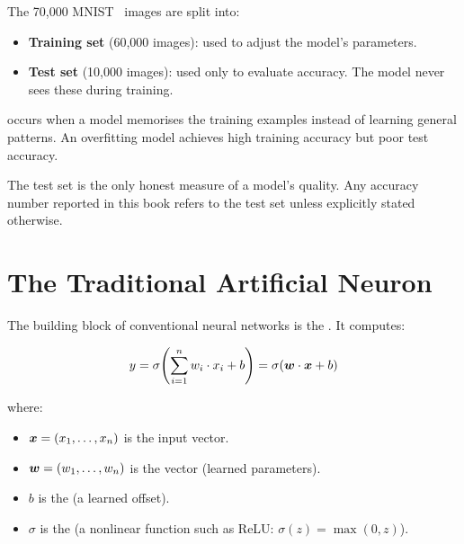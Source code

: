 The 70,000 MNIST~\cite{lecun1998mnist} images are split into:
\begin{itemize}
  \item \textbf{Training set} (60,000 images): used to adjust the
    model's parameters.
  \item \textbf{Test set} (10,000 images): used only to evaluate
    accuracy. The model never sees these during training.
\end{itemize}

 occurs when a model memorises the training
examples instead of learning general patterns. An overfitting model
achieves high training accuracy but poor test accuracy.

\begin{keyinsight}
The test set is the only honest measure of a model's quality. Any
accuracy number reported in this book refers to the test set unless
explicitly stated otherwise.
\end{keyinsight}


\section{The Traditional Artificial Neuron}
\label{sec:neuron}

The building block of conventional neural networks is the
. It computes:

\begin{equation}
  y = \sigma\!\left(\sum_{i=1}^{n} w_i \cdot x_i + b\right)
    = \sigma(\bm{w} \cdot \bm{x} + b)
  \label{eq:neuron}
\end{equation}

where:
\begin{itemize}
  \item $\bm{x} = (x_1, \ldots, x_n)$ is the input vector.
  \item $\bm{w} = (w_1, \ldots, w_n)$ is the 
    vector (learned parameters).
  \item $b$ is the  (a learned offset).
  \item $\sigma$ is the  (a nonlinear
    function such as ReLU: $\sigma(z) = \max(0, z)$).
\end{itemize}


